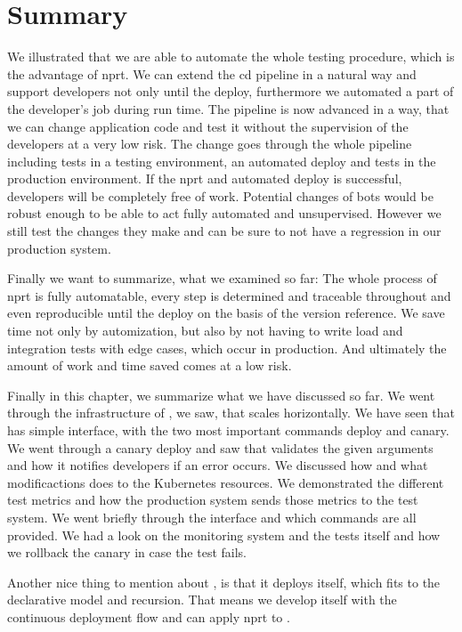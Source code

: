 \section{Summary}

We illustrated that we are able to automate the whole testing procedure, which is the
advantage of \gls{nprt}. We can extend the \gls{cd} pipeline in a natural way and support
developers not only until the deploy, furthermore we automated a part of the developer's
job during run time. The pipeline is now advanced in a way, that we can change application
code and test it without the supervision of the developers at a very low risk. The change
goes through the whole pipeline including tests in a testing environment, an automated
deploy and tests in the production environment. If the \gls{nprt} and automated deploy is
successful, developers will be completely free of work. Potential changes of bots would be
robust enough to be able to act fully automated and unsupervised. However we still test
the changes they make and can be sure to not have a regression in our production system.

Finally we want to summarize, what we examined so far: The whole process of \gls{nprt} is
fully automatable, every step is determined and traceable throughout and even reproducible
until the deploy on the basis of the version reference. We save time not only by
automization, but also by not having to write load and integration tests with edge cases,
which occur in production. And ultimately the amount of work and time saved comes at a low
risk.


Finally in this chapter, we summarize what we have discussed so far. We went through the
infrastructure of \deployer, we saw, that \deployer scales horizontally. We have seen that
\deployer has simple interface, with the two most important commands deploy and canary. We
went through a canary deploy and saw that \deployer validates the given arguments and how
it notifies developers if an error occurs. We discussed how and what modificactions
\deployer does to the Kubernetes resources. We demonstrated the different test metrics and
how the production system sends those metrics to the test system. We went briefly through
the \deployer interface and which commands are all provided. We had a look on the
monitoring system and the tests itself and how we rollback the canary in case the test
fails.

Another nice thing to mention about \deployer, is that it deploys itself, which fits to the
declarative model and recursion. That means we develop \deployer itself with the continuous
deployment flow and can apply \gls{nprt} to \deployer.



